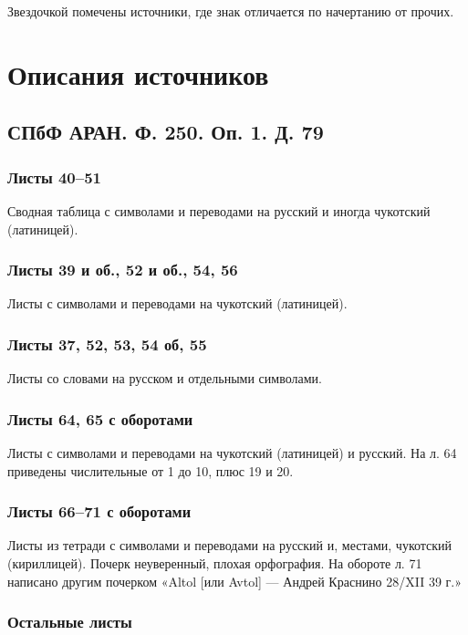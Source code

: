 \documentclass{article}
\begin{document}
Звездочкой помечены источники, где знак отличается по начертанию от прочих.

\section{Описания источников} 

\subsection{СПбФ АРАН. Ф. 250. Оп. 1. Д. 79}

\subsubsection{Листы 40–51}

Сводная таблица с символами и переводами на русский и иногда чукотский (латиницей).

\subsubsection{Листы 39 и об., 52 и об., 54, 56}

Листы с символами и переводами на чукотский (латиницей).

\subsubsection{Листы 37, 52, 53, 54 об, 55}

Листы со словами на русском и отдельными символами.

\subsubsection{Листы 64, 65 с оборотами}

Листы с символами и переводами на чукотский (латиницей) и русский. На л. 64 приведены числительные от 1 до 10, плюс 19 и 20.

\subsubsection{Листы 66–71 с оборотами}

Листы из тетради с символами и переводами на русский и, местами, чукотский (кириллицей). Почерк неуверенный, плохая орфография. На обороте л. 71 написано другим почерком «Altol [или Avtol] — Андрей Краснино 28/XII 39 г.»

\subsubsection{Остальные листы}
\end{document}
